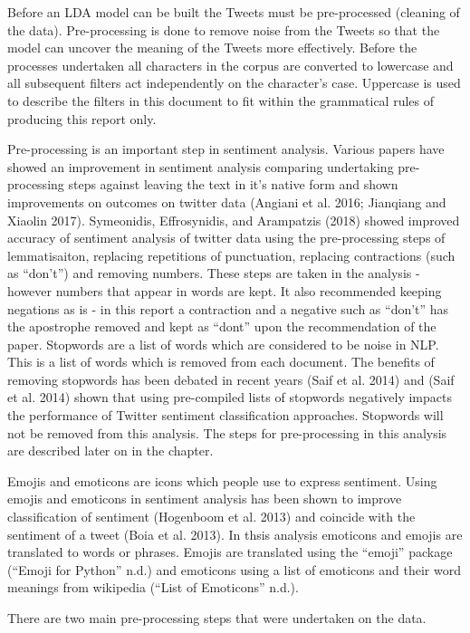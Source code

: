 \documentclass[
]{article}
\begin{document}
Before an LDA model can be built the Tweets must be pre-processed
(cleaning of the data). Pre-processing is done to remove noise from the
Tweets so that the model can uncover the meaning of the Tweets more
effectively. Before the processes undertaken all characters in the
corpus are converted to lowercase and all subsequent filters act
independently on the character's case. Uppercase is used to describe the
filters in this document to fit within the grammatical rules of
producing this report only.

Pre-processing is an important step in sentiment analysis. Various
papers have showed an improvement in sentiment analysis comparing
undertaking pre-processing steps against leaving the text in it's native
form and shown improvements on outcomes on twitter data (Angiani et al.
2016; Jianqiang and Xiaolin 2017). Symeonidis, Effrosynidis, and
Arampatzis (2018) showed improved accuracy of sentiment analysis of
twitter data using the pre-processing steps of lemmatisaiton, replacing
repetitions of punctuation, replacing contractions (such as ``don't'')
and removing numbers. These steps are taken in the analysis - however
numbers that appear in words are kept. It also recommended keeping
negations as is - in this report a contraction and a negative such as
``don't'' has the apostrophe removed and kept as ``dont'' upon the
recommendation of the paper. Stopwords are a list of words which are
considered to be noise in NLP. This is a list of words which is removed
from each document. The benefits of removing stopwords has been debated
in recent years (Saif et al. 2014) and (Saif et al. 2014) shown that
using pre-compiled lists of stopwords negatively impacts the performance
of Twitter sentiment classification approaches. Stopwords will not be
removed from this analysis. The steps for pre-processing in this
analysis are described later on in the chapter.

Emojis and emoticons are icons which people use to express sentiment.
Using emojis and emoticons in sentiment analysis has been shown to
improve classification of sentiment (Hogenboom et al. 2013) and coincide
with the sentiment of a tweet (Boia et al. 2013). In thsis analysis
emoticons and emojis are translated to words or phrases. Emojis are
translated using the ``emoji'' package ({``Emoji for Python''} n.d.) and
emoticons using a list of emoticons and their word meanings from
wikipedia ({``List of Emoticons''} n.d.).

There are two main pre-processing steps that were undertaken on the
data.
\end{document}
